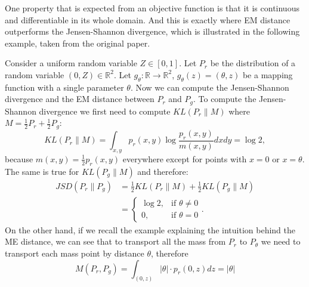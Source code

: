 One property that is expected from an objective function is that it is continuous and differentiable in its whole domain. And this is exactly where EM distance outperforms the Jensen-Shannon divergence, which is illustrated in the following example, taken from the original paper. 

Consider a uniform random variable $Z \in [0, 1]$. Let $P_r$ be the distribution of a random variable $(0, Z) \in \mathbb{R}^2$. Let $g_\theta: \mathbb{R} \rightarrow \mathbb{R}^2$, $g_\theta(z) = (\theta, z)$ be a mapping function with a single parameter $\theta$. Now we can compute the Jensen-Shannon divergence and the EM distance between $P_r$ and $P_g$. 
To compute the Jensen-Shannon divergence we first need to compute $KL(P_r \lVert M)$ where $M = \frac{1}{2}P_r + \frac{1}{2}P_g$:
\begin{equation}
	KL(P_r \lVert M) = \int_{x,y} p_r(x,y) \log \frac{p_r(x,y)}{m(x,y)} dxdy = \log2,
\end{equation}
because $m(x,y) = \frac{1}{2} p_r(x,y)$ everywhere except for points with $x=0$ or $x=\theta$. The same is true for $KL(P_g \lVert M)$ and therefore:
\begin{align*}
 JSD(P_r \lVert P_g) &= \frac{1}{2}KL(P_r \lVert M) + \frac{1}{2}KL(P_g\lVert M) \\ 
 	&= \begin{cases}
 		\log2, & \text{if } \theta \neq 0 \\
 		0, & \text{if } \theta = 0
 	\end{cases}.
\end{align*}  
On the other hand, if we recall the example explaining the intuition behind the ME distance, we can see that to transport all the mass from $P_r$ to $P_\theta$ we need to transport each mass point by distance $\theta$, therefore
\begin{equation}
	M(P_r, P_g) = \int_{(0,z)} |\theta| \cdot p_r(0,z)dz = |\theta|
\end{equation}

